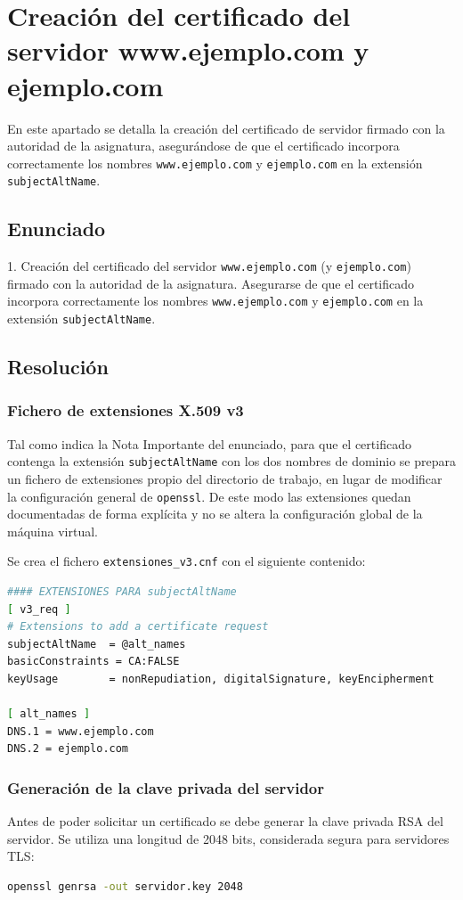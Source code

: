 \chapter{Creación del certificado del servidor www.ejemplo.com y ejemplo.com}
En este apartado se detalla la creación del certificado de servidor firmado con
la autoridad de la asignatura, asegurándose de que el certificado incorpora
correctamente los nombres \texttt{www.ejemplo.com} y \texttt{ejemplo.com} en
la extensión \texttt{subjectAltName}.
\section{Enunciado}
1. Creación del certificado del servidor \texttt{www.ejemplo.com} (y \texttt{ejemplo.com}) firmado con la autoridad de la asignatura. Asegurarse de que el certificado incorpora correctamente los nombres \texttt{www.ejemplo.com} y \texttt{ejemplo.com} en la extensión \texttt{subjectAltName}.

\section{Resolución}

\subsection{Fichero de extensiones X.509 v3}
Tal como indica la Nota Importante del enunciado, para que el certificado contenga la extensión \texttt{subjectAltName} con los dos nombres de dominio se prepara un fichero de extensiones propio del directorio de trabajo, en lugar de modificar la configuración general de \texttt{openssl}. De este modo las extensiones quedan documentadas de forma explícita y no se altera la configuración global de la máquina virtual.

Se crea el fichero \texttt{extensiones\_v3.cnf} con el siguiente contenido:
\begin{lstlisting}[language=bash, caption={Fichero extensiones\_v3.cnf}]
#### EXTENSIONES PARA subjectAltName
[ v3_req ]
# Extensions to add a certificate request
subjectAltName  = @alt_names
basicConstraints = CA:FALSE
keyUsage        = nonRepudiation, digitalSignature, keyEncipherment

[ alt_names ]
DNS.1 = www.ejemplo.com
DNS.2 = ejemplo.com
\end{lstlisting}

\subsection{Generación de la clave privada del servidor}
Antes de poder solicitar un certificado se debe generar la clave privada RSA del servidor. Se utiliza una longitud de 2048 bits, considerada segura para servidores TLS:
\begin{lstlisting}[language=bash]
openssl genrsa -out servidor.key 2048
\end{lstlisting}

